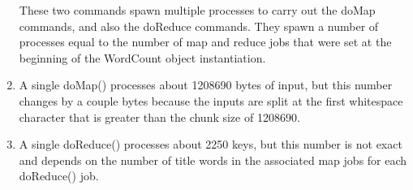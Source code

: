 \documentclass[psamsfonts]{amsart}
\begin{document}
\begin{enumerate}
  These two commands spawn multiple processes to carry out the doMap commands, and also the doReduce commands. They spawn a number of processes equal to the number of map and reduce jobs that were set at the beginning of the WordCount object instantiation.
  \item A single doMap() processes about 1208690 bytes of input, but this number changes by a couple bytes because the inputs are split at the first whitespace character that is greater than the chunk size of 1208690.
  \item A single doReduce() processes about 2250 keys, but this number is not exact and depends on the number of title words in the associated map jobs for each doReduce() job.


\end{enumerate}
\end{document}
